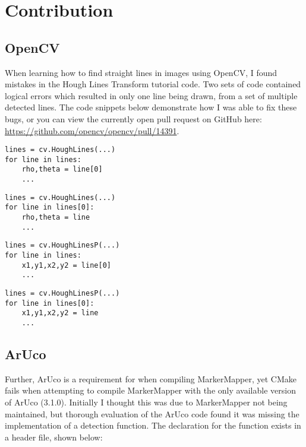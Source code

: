 \chapter{Contribution}\label{chap:contributing}

\section{OpenCV}

When learning how to find straight lines in images using OpenCV, I found mistakes in the Hough Lines Transform tutorial code. Two sets of code contained logical errors which resulted in only one line being drawn, from a set of multiple detected lines. The code snippets below demonstrate how I was able to fix these bugs, or you can view the currently open pull request on GitHub here: \url{https://github.com/opencv/opencv/pull/14391}.

\vfill
\begin{multicols}{2}
\begin{lstlisting}[style=python,caption={Hough Lines tutorial code}]
lines = cv.HoughLines(...)
for line in lines:
    rho,theta = line[0]
    ...
\end{lstlisting}
\begin{lstlisting}[style=python,caption={Fixed array indexing bug}]
lines = cv.HoughLines(...)
for line in lines[0]:
    rho,theta = line
    ...
\end{lstlisting}
\end{multicols}

\begin{multicols}{2}
\begin{lstlisting}[style=python,caption={Hough Lines P tutorial code}]
lines = cv.HoughLinesP(...)
for line in lines:
    x1,y1,x2,y2 = line[0]
    ...
\end{lstlisting}
\begin{lstlisting}[style=python,caption={Fixed array indexing bug}]
lines = cv.HoughLinesP(...)
for line in lines[0]:
    x1,y1,x2,y2 = line
    ...
\end{lstlisting}
\end{multicols}
\vfill
\newpage
\section{ArUco}

Further, ArUco is a requirement for when compiling MarkerMapper, yet CMake fails when attempting to compile MarkerMapper with the only available version of ArUco (3.1.0). Initially I thought this was due to MarkerMapper not being maintained, but thorough evaluation of the ArUco code found it was missing the implementation of a detection function. The declaration for the function exists in a header file, shown below:

